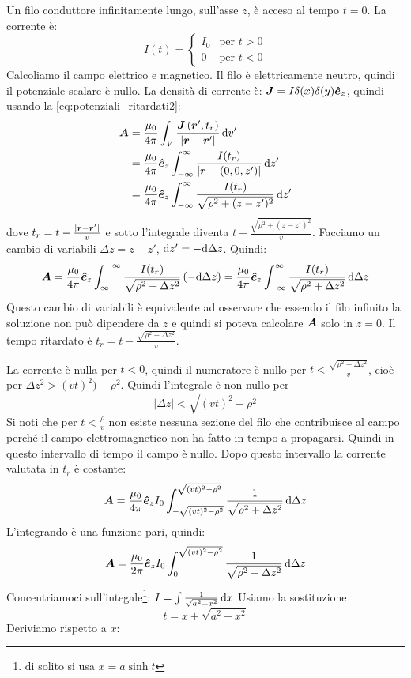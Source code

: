 \begin{Es}
  Un filo conduttore infinitamente lungo, sull'asse $z$, è acceso al tempo $t=0$. La corrente è:
  \[ I(t) =
    \begin{cases}
      I_0 & \text{per } t>0 \\
      0   & \text{per } t<0
    \end{cases}
  \]
  Calcoliamo il campo elettrico e magnetico. Il filo è elettricamente neutro, quindi il potenziale scalare è nullo. La densità di corrente è:  \(\boldsymbol{J} = I\delta(x)\delta(y)\boldsymbol{\hat {e}}_z    \), quindi usando la \eqref{eq:potenziali_ritardati2}:
  \begin{align*}
    \boldsymbol{A} & = \frac{\mu_0}{4\pi}\int_V\frac{\boldsymbol{J}\left(\boldsymbol{r}', t_r\right)}{|\boldsymbol{r} - \boldsymbol{r}'|}\,\mathrm{d} v'            \\
          & = \frac{\mu_0}{4\pi}\boldsymbol{\hat {e}}_z\int_{-\infty}^{\infty} \frac{I(t_r)}{|\boldsymbol{r} - (0, 0, z')|}\,\mathrm{d} z'     \\
          & = \frac{\mu_0}{4\pi}\boldsymbol{\hat {e}}_z\int_{-\infty}^{\infty} \frac{I(t_r)}{\sqrt{\rho^2 + (z-z')^2}}\,\mathrm{d} z'
  \end{align*}
  dove \(t_r = t - \frac{|\boldsymbol{r} - \boldsymbol{r}'|}{v}\) e sotto l'integrale diventa \(t - \frac{\sqrt{\rho^2+(z-z')^2}}{v}\). Facciamo un cambio di variabili $\Delta z = z-z'$, $\mathrm{d} z' = -\mathrm{d} \Delta z$. Quindi:
  \[
    \boldsymbol{A} = \frac{\mu_0}{4\pi}\boldsymbol{\hat {e}}_z\int_{\infty}^{-\infty} \frac{I(t_r)}{\sqrt{\rho^2 + \Delta z^2}}\,(-\mathrm{d} \Delta z) = \frac{\mu_0}{4\pi}\boldsymbol{\hat {e}}_z\int_{-\infty}^{\infty} \frac{I(t_r)}{\sqrt{\rho^2 + \Delta z^2}}\,\mathrm{d} \Delta z
  \]
  Questo cambio di variabili è equivalente ad osservare che essendo il filo infinito la soluzione non può dipendere da $z$ e quindi si poteva calcolare $\boldsymbol{A}$ solo in $z=0$. Il tempo ritardato è $t_r=t-\frac{\sqrt{\rho^2-\Delta z^2}}{v}$.

  La corrente è nulla per \(t<0\), quindi il numeratore è nullo per \(t < \frac{\sqrt{\rho^2+\Delta z^2}}{v}\), cioè per $\Delta z^2 > (vt)^2)-\rho^2$. Quindi l'integrale è non nullo per
  \[|\Delta z| < \sqrt{(vt)^2-\rho^2}\]
  Si noti che per \(t<\frac{\rho}{v}\) non esiste nessuna sezione del filo che contribuisce al campo perché il campo elettromagnetico non ha fatto in tempo a propagarsi. Quindi in questo intervallo di tempo il campo è nullo. Dopo questo intervallo la corrente valutata in $t_r$ è costante:
  \[
    \boldsymbol{A}= \frac{\mu_0}{4\pi}\boldsymbol{\hat {e}}_z I_0\int_{-\sqrt{(vt)^2-\rho^2}}^{\sqrt{(vt)^2-\rho^2}} \frac{1}{\sqrt{\rho^2 + \Delta z^2}}\,\mathrm{d} \Delta z
  \]
  L'integrando è una funzione pari, quindi:
  \[
    \boldsymbol{A} = \frac{\mu_0}{2\pi}\boldsymbol{\hat {e}}_z I_0\int_{0}^{\sqrt{(vt)^2-\rho^2}} \frac{1}{\sqrt{\rho^2 + \Delta z^2}}\,\mathrm{d} \Delta z
  \]
  Concentriamoci sull'integale\footnote{di solito si usa $x = a\sinh t$}:
  \(
  I=\int \frac{1}{\sqrt{a^2+x^2}}\,\mathrm{d} x
  \)
  Usiamo la sostituzione
  \[
    t = x + \sqrt{a^2 + x^2}
  \]
  Deriviamo rispetto a \(x\):


\end{Es}
